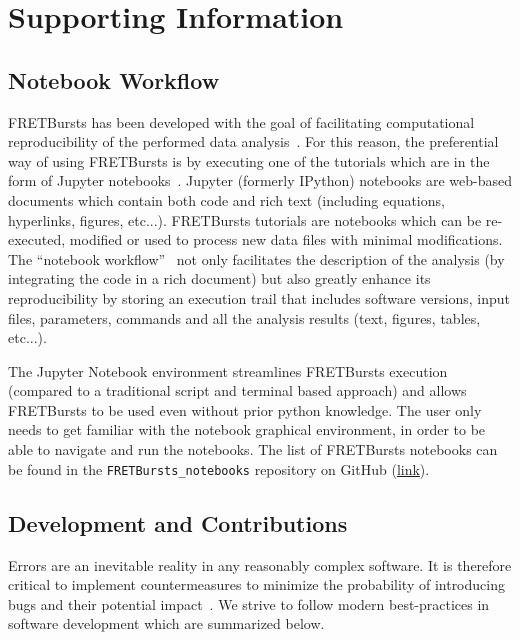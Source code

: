 \section{Supporting Information}

\subsection{Notebook Workflow}
\label{sec:notebook}

FRETBursts has been developed with the goal of facilitating computational reproducibility
of the performed data analysis~\cite{Buckheit_1995}. For this reason,
the preferential way of using FRETBursts is by executing one of the tutorials
which are in the form of Jupyter notebooks~\cite{Shen_2014}.
Jupyter (formerly IPython) notebooks are web-based documents which contain both
code and rich text (including equations, hyperlinks, figures, etc...).
FRETBursts tutorials are notebooks which can be re-executed,
modified or used to process new data files with minimal modifications.
The ``notebook workflow''~\cite{Shen_2014} not only facilitates
the description of the analysis (by integrating the code in a rich document)
but also greatly enhance its reproducibility by storing an execution trail
that includes software versions, input files, parameters, commands and all
the analysis results (text, figures, tables, etc...).

The Jupyter Notebook environment streamlines FRETBursts execution (compared to
a traditional script and terminal based approach) and allows
FRETBursts to be used even without prior python knowledge.
The user only needs to get familiar with the
notebook graphical environment, in order to be able to navigate and run the notebooks.
The list of FRETBursts notebooks can be found in the
\verb|FRETBursts_notebooks| repository on GitHub
(\href{https://github.com/tritemio/FRETBursts_notebooks}{link}).


\subsection{Development and Contributions}
\label{sec:dev}
Errors are an inevitable reality in any reasonably complex software. It is
therefore critical to implement countermeasures to
minimize the probability of introducing bugs and their potential impact~\cite{Prli__2012, Wilson_2014}.
We strive to follow modern best-practices in software development which are summarized
below.

